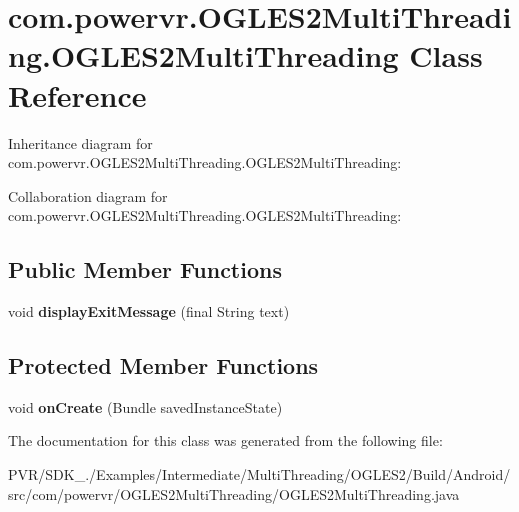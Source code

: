 \hypertarget{classcom_1_1powervr_1_1_o_g_l_e_s2_multi_threading_1_1_o_g_l_e_s2_multi_threading}{\section{com.\+powervr.\+O\+G\+L\+E\+S2\+Multi\+Threading.\+O\+G\+L\+E\+S2\+Multi\+Threading Class Reference}
\label{classcom_1_1powervr_1_1_o_g_l_e_s2_multi_threading_1_1_o_g_l_e_s2_multi_threading}
}


Inheritance diagram for com.\+powervr.\+O\+G\+L\+E\+S2\+Multi\+Threading.\+O\+G\+L\+E\+S2\+Multi\+Threading\+:


Collaboration diagram for com.\+powervr.\+O\+G\+L\+E\+S2\+Multi\+Threading.\+O\+G\+L\+E\+S2\+Multi\+Threading\+:
\subsection*{Public Member Functions}
\begin{DoxyCompactItemize}
\item 
\hypertarget{classcom_1_1powervr_1_1_o_g_l_e_s2_multi_threading_1_1_o_g_l_e_s2_multi_threading_a3198f37b5f593bd9659636ed471d5522}{void {\bfseries display\+Exit\+Message} (final String text)}\label{classcom_1_1powervr_1_1_o_g_l_e_s2_multi_threading_1_1_o_g_l_e_s2_multi_threading_a3198f37b5f593bd9659636ed471d5522}

\end{DoxyCompactItemize}
\subsection*{Protected Member Functions}
\begin{DoxyCompactItemize}
\item 
\hypertarget{classcom_1_1powervr_1_1_o_g_l_e_s2_multi_threading_1_1_o_g_l_e_s2_multi_threading_a31d1bb009809730d5d749e47cab46206}{void {\bfseries on\+Create} (Bundle saved\+Instance\+State)}\label{classcom_1_1powervr_1_1_o_g_l_e_s2_multi_threading_1_1_o_g_l_e_s2_multi_threading_a31d1bb009809730d5d749e47cab46206}

\end{DoxyCompactItemize}


The documentation for this class was generated from the following file\+:\begin{DoxyCompactItemize}
\item 
P\+V\+R/\+S\+D\+K\+\_./\+Examples/\+Intermediate/\+Multi\+Threading/\+O\+G\+L\+E\+S2/\+Build/\+Android/src/com/powervr/\+O\+G\+L\+E\+S2\+Multi\+Threading/O\+G\+L\+E\+S2\+Multi\+Threading.\+java\end{DoxyCompactItemize}
